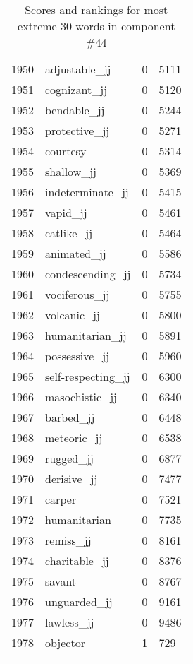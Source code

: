 \begin{longtable}[!htbp]{| rlr@{.}l |}
    1950 & adjustable\_jj & 0 & 5111 \\
    1951 & cognizant\_jj & 0 & 5120 \\
    1952 & bendable\_jj & 0 & 5244 \\
    1953 & protective\_jj & 0 & 5271 \\
    1954 & courtesy & 0 & 5314 \\
    1955 & shallow\_jj & 0 & 5369 \\
    1956 & indeterminate\_jj & 0 & 5415 \\
    1957 & vapid\_jj & 0 & 5461 \\
    1958 & catlike\_jj & 0 & 5464 \\
    1959 & animated\_jj & 0 & 5586 \\
    1960 & condescending\_jj & 0 & 5734 \\
    1961 & vociferous\_jj & 0 & 5755 \\
    1962 & volcanic\_jj & 0 & 5800 \\
    1963 & humanitarian\_jj & 0 & 5891 \\
    1964 & possessive\_jj & 0 & 5960 \\
    1965 & self-respecting\_jj & 0 & 6300 \\
    1966 & masochistic\_jj & 0 & 6340 \\
    1967 & barbed\_jj & 0 & 6448 \\
    1968 & meteoric\_jj & 0 & 6538 \\
    1969 & rugged\_jj & 0 & 6877 \\
    1970 & derisive\_jj & 0 & 7477 \\
    1971 & carper & 0 & 7521 \\
    1972 & humanitarian & 0 & 7735 \\
    1973 & remiss\_jj & 0 & 8161 \\
    1974 & charitable\_jj & 0 & 8376 \\
    1975 & savant & 0 & 8767 \\
    1976 & unguarded\_jj & 0 & 9161 \\
    1977 & lawless\_jj & 0 & 9486 \\
    1978 & objector & 1 & 729 \\
    \hline
    \caption{Scores and rankings for most extreme 30 words in component \#44} \\
\end{longtable}
